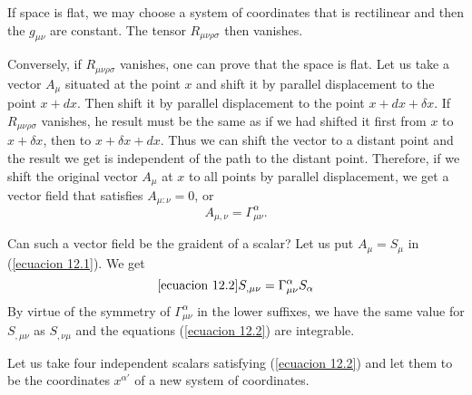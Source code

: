 If space is flat, we may choose a system of coordinates that is rectilinear and 
then the $g_{\mu\nu}$ are constant. The tensor $R_{\mu\nu\rho\sigma}$ then 
vanishes.

Conversely, if $R_{\mu\nu\rho\sigma}$ vanishes, one can prove that the space is 
flat. Let us take a vector $A_{\mu}$ situated at the point $x$ and shift it by 
parallel displacement to the point $x+dx$. Then shift it by parallel 
displacement to the point $x+dx+\delta x$. If $R_{\mu\nu\rho\sigma}$ vanishes, 
he result must be the same as if we had shifted it first from $x$ to $x+\delta 
x$, then to $x+\delta x+ dx$. Thus we can shift the vector to a distant point 
and the result we get is independent of the path to the distant point. 
Therefore, if we shift the original vector $A_{\mu}$ at $x$ to all points by 
parallel displacement, we get a vector field that satisfies $A_{\mu:\nu}=0$, or
\begin{equation}
 \label{ecuacion 12.1}
 A_{\mu,\nu} = \Gamma^{\alpha}_{\mu\nu}.
\end{equation}

Can such a vector field be the graident of a scalar? Let us put $A_{\mu} = 
S_{\mu}$ in (\ref{ecuacion 12.1}). We get 
\begin{equation}
 \ref{ecuacion 12.2}
 S_{,\mu\nu} = \Gamma^{\alpha}_{\mu\nu} S_{\alpha}
\end{equation}
By virtue of the symmetry of $\Gamma^{\alpha}_{\mu\nu}$ in the lower suffixes, 
we have the same value for $S_{,\mu\nu}$ as $S_{,\nu\mu}$ and the equations 
(\ref{ecuacion 12.2}) are integrable.

Let us take four independent scalars satisfying (\ref{ecuacion 12.2}) and let 
them to be the coordinates $x^{\alpha'}$ of a new system of coordinates.
